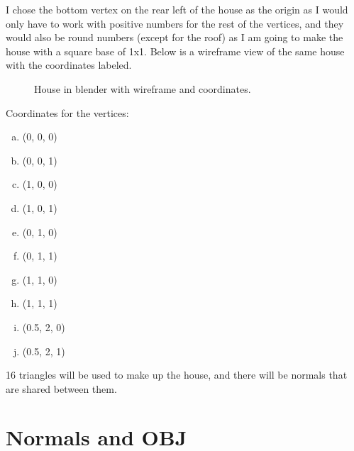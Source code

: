 \documentclass[10pt]{report}
\begin{document}
I chose the bottom vertex on the rear left of the house as the origin as I would only have to work with positive numbers for the rest of the vertices, and they would also be round numbers (except for the roof) as I am going to make the house with a square base of 1x1. Below is a wireframe view of the same house with the coordinates labeled.

\begin{figure}[H]
    \centering
    \caption{House in blender with wireframe and coordinates.}
\end{figure}

Coordinates for the vertices:
\begin{enumerate}[(a)]
    \item (0, 0, 0)
    \item (0, 0, 1)
    \item (1, 0, 0)
    \item (1, 0, 1)
    \item (0, 1, 0)
    \item (0, 1, 1)
    \item (1, 1, 0)
    \item (1, 1, 1)
    \item (0.5, 2, 0)
    \item (0.5, 2, 1)
\end{enumerate}

16 triangles will be used to make up the house, and there will be normals that are shared between them.

\section{Normals and OBJ}
\end{document}

